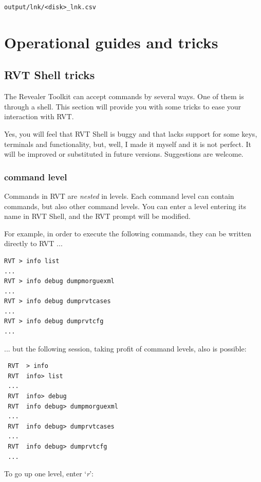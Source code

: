 \documentclass[a4paper,11pt,oneside]{report}
\begin{document}
\begin{verbatim}
output/lnk/<disk>_lnk.csv
\end{verbatim}




\chapter{Operational guides and tricks}



\section{RVT Shell tricks}

The Revealer Toolkit can accept commands by several ways. One of them is through a shell. This section will provide you with some tricks to ease your interaction with RVT.

Yes, you will feel that RVT Shell is buggy and that lacks support for some keys, terminals and functionality, but, well, I made it myself and it is not perfect. It will be improved or substituted in future versions. Suggestions are welcome.


\subsection{command level}

Commands in RVT are \emph{nested} in levels. Each command level can contain commands, but also other command levels. You can enter a level entering its name in RVT Shell, and the RVT prompt will be modified.

For example, in order to execute the following commands, they can be written directly to RVT ...

\begin{verbatim}
RVT > info list
...
RVT > info debug dumpmorguexml
...
RVT > info debug dumprvtcases
...
RVT > info debug dumprvtcfg
...
\end{verbatim}


... but the following session, taking profit of command levels, also is possible:

\begin{verbatim}
 RVT  > info 
 RVT  info> list
 ...  
 RVT  info> debug
 RVT  info debug> dumpmorguexml
 ...
 RVT  info debug> dumprvtcases
 ...
 RVT  info debug> dumprvtcfg
 ...
\end{verbatim}


To go up one level, enter `\emph{r}':
\end{document}
